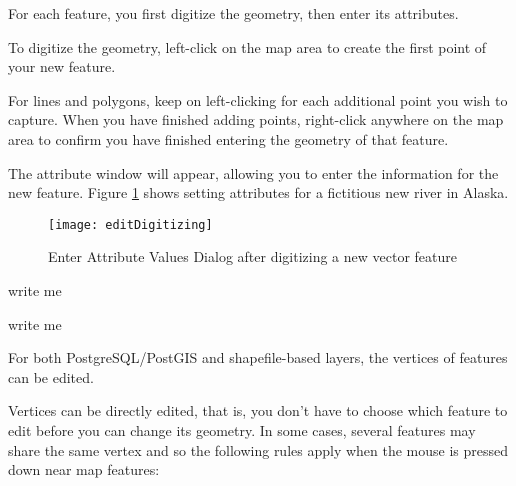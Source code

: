 For each feature, you first digitize the geometry, then enter its attributes.

To digitize the geometry, left-click on the map area to create the
first point of your new feature.

For lines and polygons, keep on left-clicking for each additional
point you wish to capture.  When you have finished adding points,
right-click anywhere on the map area to confirm you have finished entering
the geometry of that feature.

The attribute window will appear, allowing you to enter the information for the new feature.
Figure \ref{fig:vector_digitising} shows setting attributes for a fictitious
new river in Alaska.

\begin{figure}[ht]
   \begin{center}
   \caption{Enter Attribute Values Dialog after digitizing a new vector
   feature}\label{fig:vector_digitising}\smallskip
   \texttt{[image: editDigitizing]}
\end{center}  
\end{figure}

\begin{Tip}[ht]\caption{\textsc{Attribute Value Types}}
\end{Tip}


write me


write me


For both PostgreSQL/PostGIS and shapefile-based layers, the vertices of features can be edited. 

Vertices can be directly edited, that is, you don't
have to choose which feature to edit before you can change
its geometry.
In some cases, several features may share the same vertex
and so the following rules apply when the mouse is pressed
down near map features:

